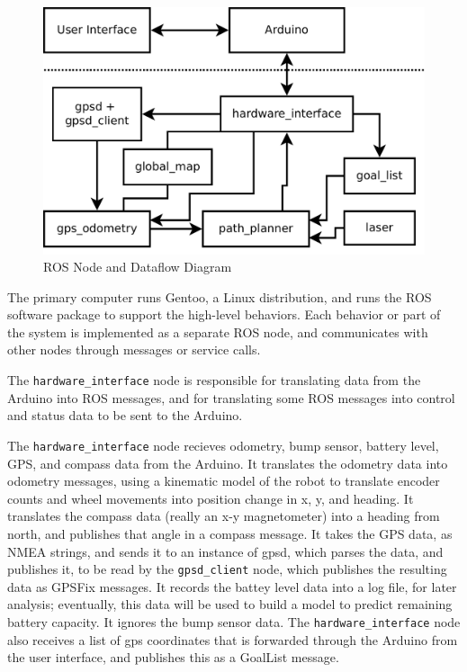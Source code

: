 
\begin{figure}
\includegraphics[width=1\textwidth]{software_flow}
\caption{ROS Node and Dataflow Diagram}
\end{figure}

The primary computer runs Gentoo, a Linux distribution, and runs the ROS software package to support the high-level behaviors. Each behavior or part of the system is implemented as a separate ROS node, and communicates with other nodes through messages or service calls.

The \texttt{hardware\_interface} node is responsible for translating data from the Arduino into ROS messages, and for translating some ROS messages into control and status data to be sent to the Arduino. 

The \texttt{hardware\_interface} node recieves odometry, bump sensor, battery level, GPS, and compass data from the Arduino. It translates the odometry data into odometry messages, using a kinematic model of the robot to translate encoder counts and wheel movements into position change in x, y, and heading. It translates the compass data (really an x-y magnetometer) into a heading from north, and publishes that angle in a compass message. It takes the GPS data, as NMEA strings, and sends it to an instance of gpsd\cite{gpsd}, which parses the data, and publishes it, to be read by the \texttt{gpsd\_client} node, which publishes the resulting data as GPSFix messages. It records the battey level data into a log file, for later analysis; eventually, this data will be used to build a model to predict remaining battery capacity. It ignores the bump sensor data. The \texttt{hardware\_interface} node also receives a list of gps coordinates that is forwarded through the Arduino from the user interface, and publishes this as a GoalList message.


